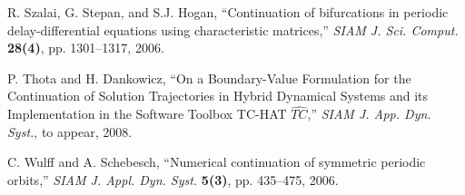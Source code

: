 \documentclass{article}
\begin{document}
\begin{thebibliography}{99}
 R. Szalai, G. Stepan, and S.J. Hogan,
``Continuation of bifurcations in periodic delay-differential equations
using characteristic matrices,'' \emph{SIAM J. Sci. Comput.} \textbf{28(4)},
pp. 1301--1317, 2006.

 P. Thota and H. Dankowicz, ``On a
Boundary-Value Formulation for the Continuation of Solution Trajectories in
Hybrid Dynamical Systems and its Implementation in the Software Toolbox
TC-HAT $\widehat{TC}$,'' \emph{SIAM J. App. Dyn. Syst.}, to appear, 2008.

 C. Wulff and A. Schebesch, ``Numerical
continuation of symmetric periodic orbits,'' \emph{SIAM J. Appl. Dyn. Syst.} 
\textbf{5(3)}, pp. 435--475, 2006.
\end{thebibliography}
\end{document}
